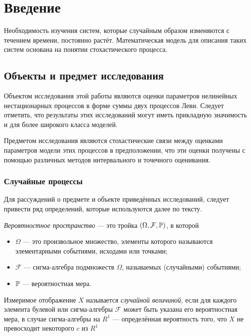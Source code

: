 \chapter*{Введение}							%
\setcounter{chapter}{1}

Необходимость изучения систем, которые случайным образом изменяются с течением времени, постоянно растёт. Математическая модель для описания таких систем основана на понятии стохастического процесса.

\section*{Объекты и предмет исследования}
Объектом исследования этой работы являются оценки параметров нелинейных нестационарных процессов в форме суммы двух процессов Леви. Следует отметить, что результаты этих исследований могут иметь прикладную значимость и для более широкого класса моделей.

Предметом исследования являются стохастические связи между оценками параметров модели этих процессов в предположении, что эти оценки получены с помощью различных методов интервального и точечного оценивания.

\subsection*{Случайные процессы}

Для рассуждений о предмете и объекте приведённых исследований, следует привести ряд определений, которые используются далее по тексту.

\begin{define}
\emph{Вероятностное пространство} --- это тройка $(\Omega, \mathcal{F}, \P)$, в которой
\begin{itemize}
	\item $\Omega$ --- это произвольное множество, элементы которого называются элементарными событиями, исходами или точками;
	\item $\mathcal{F}$ --- сигма-алгебра подмножеств $\Omega$, называемых (случайными) событиями;
	\item $\P$ --- вероятностная мера.
\end{itemize}
\end{define}

\begin{define}
	Измеримое отображение $X$ называется \emph{случайной величиной}, если для каждого элемента булевой или сигма-алгебры $\mathcal{F}$ может быть указана его вероятностная мера, в случае сигма-алгебры на $R^1$ --- определённая вероятность того, что $X$ не превосходит некоторого $c$ из $R^1$
\end{define}

